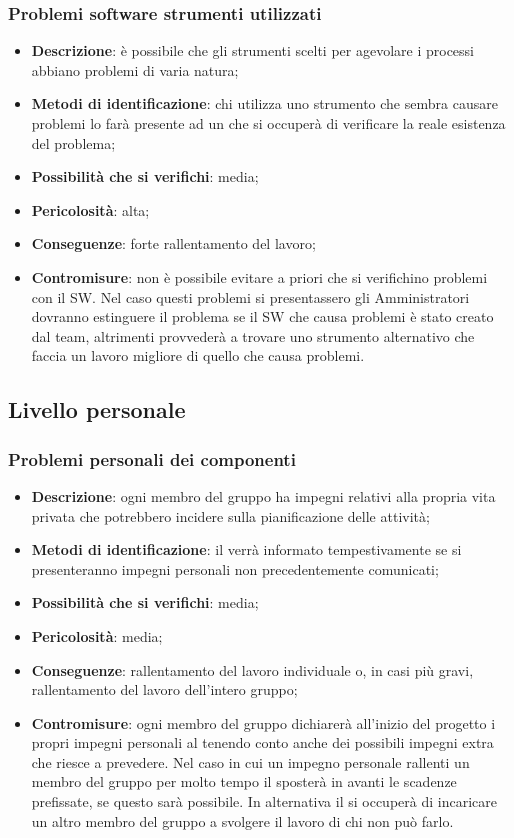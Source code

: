 		\subsubsection{Problemi software strumenti utilizzati}
		\begin{itemize}
			\item \textbf{Descrizione}: è possibile che gli strumenti scelti per agevolare i processi abbiano problemi di varia natura;
			\item \textbf{Metodi di identificazione}: chi utilizza uno strumento che sembra causare problemi lo farà presente ad un \AM{} che si occuperà di verificare la reale esistenza del problema;
			\item \textbf{Possibilità che si verifichi}: media;
			\item \textbf{Pericolosità}: alta;
			\item \textbf{Conseguenze}: forte rallentamento del lavoro;
			\item \textbf{Contromisure}: non è possibile evitare a priori che si verifichino problemi con il SW. Nel caso questi problemi si presentassero gli Amministratori dovranno estinguere il problema se il SW che causa problemi è stato creato dal team, altrimenti provvederà a trovare uno strumento alternativo che faccia un lavoro migliore di quello che causa problemi.
		\end{itemize}
		
		
	\subsection{Livello personale}
		\subsubsection{Problemi personali dei componenti}
		\begin{itemize}
			\item \textbf{Descrizione}: ogni membro del gruppo ha impegni relativi alla propria vita privata che potrebbero incidere sulla pianificazione delle attività;
			\item \textbf{Metodi di identificazione}: il \RES{} verrà informato tempestivamente se si presenteranno impegni personali non precedentemente comunicati;
			\item \textbf{Possibilità che si verifichi}: media;
			\item \textbf{Pericolosità}: media;
			\item \textbf{Conseguenze}: rallentamento del lavoro individuale o, in casi più gravi, rallentamento del lavoro dell'intero gruppo;
			\item \textbf{Contromisure}: ogni membro del gruppo dichiarerà all'inizio del progetto i propri impegni personali al \RES{} tenendo conto anche dei possibili impegni extra che riesce a prevedere. Nel caso in cui un impegno personale rallenti un membro del gruppo per molto tempo il \RES{} sposterà in avanti le scadenze prefissate, se questo sarà possibile. In alternativa il \RES{} si occuperà di incaricare un altro membro del gruppo a svolgere il lavoro di chi non può farlo. 
		\end{itemize}
		
